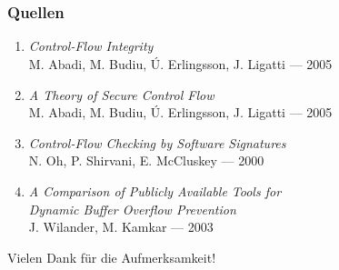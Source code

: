 \documentclass[mathserif,slidestop,compress,red]{beamer}
\begin{document}
\section*{}

\begin{frame}
  \frametitle{Quellen}
  \begin{enumerate}
    \item \emph{Control-Flow Integrity} \\ M. Abadi, M. Budiu, Ú. Erlingsson, J. Ligatti — 2005
    \item \emph{A Theory of Secure Control Flow} \\ M. Abadi, M. Budiu, Ú. Erlingsson, J. Ligatti — 2005
    \item \emph{Control-Flow Checking by Software Signatures} \\ N. Oh, P. Shirvani, E. McCluskey — 2000
    \item \emph{A Comparison of Publicly Available Tools for \\ Dynamic Buffer Overflow Prevention} \\
        J. Wilander, M. Kamkar — 2003
  \end{enumerate}
\end{frame}

{
\begin{frame}[c,plain]
  \begin{center}
    Vielen Dank für die Aufmerksamkeit!
  \end{center}
\end{frame}
}
\end{document}
